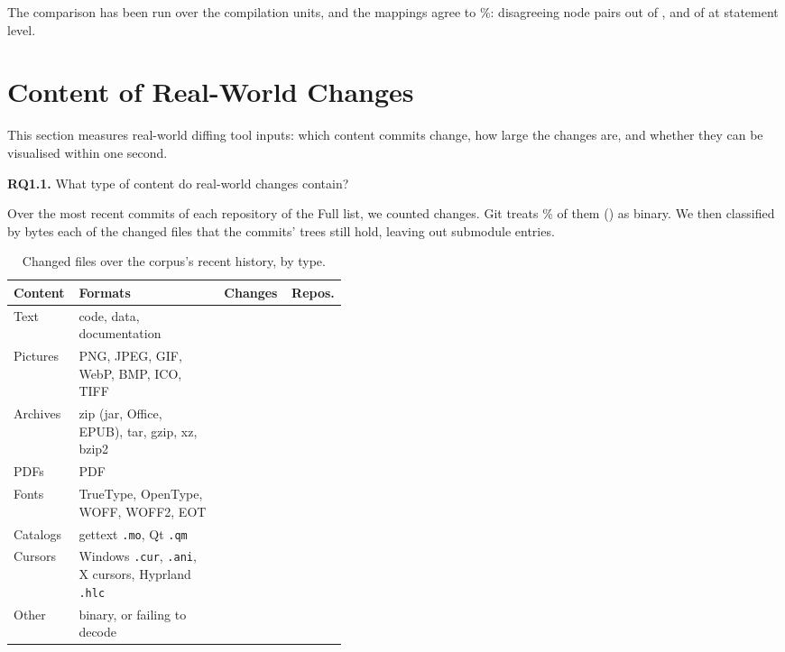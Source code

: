 \documentclass[sigconf,review]{acmart}
\begin{document}
The comparison has been run over the \OracleHumanUnits{} compilation units, and the mappings
agree to \OracleHumanPrecision{}\%: \OracleHumanDisagreements{}
disagreeing node pairs out of \OracleHumanMappings{}, and \OracleHumanStatementDisagreements{} of
\OracleHumanStatementMappings{} at statement level.

\section{Content of Real-World Changes}
\label{sec:content}

This section measures real-world diffing tool inputs: which content commits change, how large the
changes are, and whether they can be visualised within one second.

\textbf{RQ1.1.} What type of content do real-world changes contain?

Over the \CorpusCloneDepth{} most recent commits of each repository of the Full list, we counted
\ChangeCensusChanges{} changes. Git treats \ChangeCensusBinaryPct{}\% of them
(\ChangeCensusBinary{}) as binary. We then classified by bytes each of the
\ContentCensusChanges{} changed files that the commits' trees still hold, leaving out submodule
entries.

\begin{table}
  \caption{Changed files over the corpus's recent history, by type.}
  \label{tab:content-census}
  \small
  \begin{tabular}{@{}l>{\raggedright\arraybackslash}p{0.43\linewidth}rr@{}}
    \toprule
    Content & Formats & Changes & Repos. \\
    \midrule
    Text & code, data, documentation & \ContentCensusText{} & \ContentCensusTextRepos{} \\ \addlinespace
    Pictures & PNG, JPEG, GIF, WebP, BMP, ICO, TIFF & \ContentCensusPictures{} & \ContentCensusPicturesRepos{} \\ \addlinespace
    Archives & zip (jar, Office, EPUB), tar, gzip, xz, bzip2 & \ContentCensusArchives{} & \ContentCensusArchivesRepos{} \\ \addlinespace
    PDFs & PDF & \ContentCensusPdfs{} & \ContentCensusPdfsRepos{} \\ \addlinespace
    Fonts & TrueType, OpenType, WOFF, WOFF2, EOT & \ContentCensusFonts{} & \ContentCensusFontsRepos{} \\ \addlinespace
    Catalogs & gettext \texttt{.mo}, Qt \texttt{.qm} & \ContentCensusCatalogs{} & \ContentCensusCatalogsRepos{} \\ \addlinespace
    Cursors & Windows \texttt{.cur}, \texttt{.ani}, X cursors, Hyprland \texttt{.hlc} & \ContentCensusCursors{} & \ContentCensusCursorsRepos{} \\
    \midrule
    Other & binary, or failing to decode & \ContentCensusLeft{} & \ContentCensusLeftRepos{} \\
    \bottomrule
  \end{tabular}
\end{table}
\end{document}
